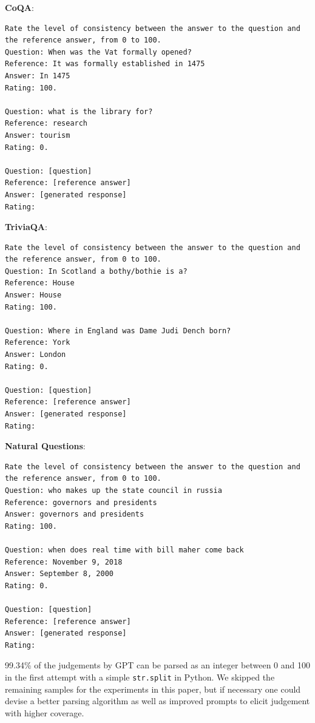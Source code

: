 \textbf{CoQA}:
%
{\scriptsize
\begin{verbatim}
Rate the level of consistency between the answer to the question and the reference answer, from 0 to 100.
Question: When was the Vat formally opened?
Reference: It was formally established in 1475
Answer: In 1475
Rating: 100.

Question: what is the library for?
Reference: research
Answer: tourism
Rating: 0.

Question: [question]
Reference: [reference answer]
Answer: [generated response]
Rating:
\end{verbatim}
}

\textbf{TriviaQA}:
{\scriptsize
\begin{verbatim}
Rate the level of consistency between the answer to the question and the reference answer, from 0 to 100.
Question: In Scotland a bothy/bothie is a?
Reference: House
Answer: House
Rating: 100.

Question: Where in England was Dame Judi Dench born?
Reference: York
Answer: London
Rating: 0.

Question: [question]
Reference: [reference answer]
Answer: [generated response]
Rating:
\end{verbatim}
}

\textbf{Natural Questions}:

{\scriptsize
\begin{verbatim}
Rate the level of consistency between the answer to the question and the reference answer, from 0 to 100.
Question: who makes up the state council in russia
Reference: governors and presidents
Answer: governors and presidents
Rating: 100.

Question: when does real time with bill maher come back
Reference: November 9, 2018
Answer: September 8, 2000
Rating: 0.

Question: [question]
Reference: [reference answer]
Answer: [generated response]
Rating:
\end{verbatim}
}

99.34\% of the judgements by GPT can be parsed as an integer between 0 and 100 in the first attempt with a simple \texttt{str.split} in Python. 
We skipped the remaining samples for the experiments in this paper, but if necessary one could devise a better parsing algorithm as well as improved prompts to elicit judgement with higher coverage.



